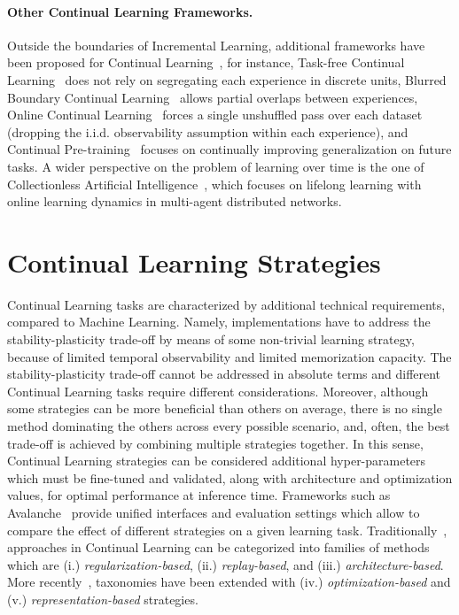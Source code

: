 \paragraph{Other Continual Learning Frameworks.}
Outside the boundaries of Incremental Learning, additional frameworks have been proposed for Continual Learning~\cite{wang2023comprehensive}, for instance, Task-free Continual Learning~\cite{aljundi2019task} does not rely on segregating each experience in discrete units, Blurred Boundary Continual Learning~\cite{bang2021rainbow} allows partial overlaps between experiences, Online Continual Learning~\cite{aljundi2019gradient} forces a single unshuffled pass over each dataset (dropping the i.i.d. observability assumption within each experience), and Continual Pre-training~\cite{sun2020ernie} focuses on continually improving generalization on future tasks. A wider perspective on the problem of learning over time is the one of Collectionless Artificial Intelligence~\cite{gori2023collectionless}, which focuses on lifelong learning with online learning dynamics in multi-agent distributed networks.

\section{Continual Learning Strategies}
Continual Learning tasks are characterized by additional technical requirements, compared to Machine Learning. Namely, implementations have to address the stability-plasticity trade-off by means of some non-trivial learning strategy, because of limited temporal observability and limited memorization capacity.
The stability-plasticity trade-off cannot be addressed in absolute terms and different Continual Learning tasks require different considerations. Moreover, although some strategies can be more beneficial than others on average, there is no single method dominating the others across every possible scenario, and, often, the best trade-off is achieved by combining multiple strategies together.
In this sense, Continual Learning strategies can be considered additional hyper-parameters which must be fine-tuned and validated, along with architecture and optimization values, for optimal performance at inference time.
Frameworks such as Avalanche~\cite{lomonaco2021avalanche} provide unified interfaces and evaluation settings which allow to compare the effect of different strategies on a given learning task.
%
Traditionally~\cite{de2021continual}, approaches in Continual Learning can be categorized into families of methods which are (i.) \textit{regularization-based}, (ii.) \textit{replay-based}, and (iii.) \textit{architecture-based}. More recently~\cite{wang2023comprehensive}, taxonomies have been extended with (iv.) \textit{optimization-based} and (v.) \textit{representation-based} strategies. 

